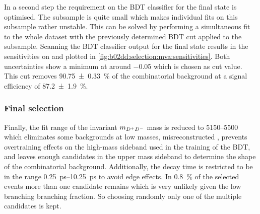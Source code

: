 In a second step the requirement on the BDT classifier for the \KKpiKpipi
final state is optimised. The \KKpiKpipi subsample is quite small which makes
individual fits on this subsample rather unstable. This can be solved by
performing a simultaneous fit to the whole dataset with the previously
determined BDT cut applied to the \KpipiKpipi subsample. Scanning the BDT
classifier output for the \KKpiKpipi final state results in the sensitivities
on \SDD and \CDD plotted in \cref{fig:b02dd:selection:mva:sensitivities}. Both
uncertainties show a minimum at around \num{-0.05} which is chosen as cut
value. This cut removes \SI{90.75\pm0.33}{\percent} of the combinatorial
background at a signal efficiency of \SI{87.2\pm1.9}{\percent}.

\subsubsection{Final selection}
\label{sec:b02dd:selection:final_selection}

Finally, the fit range of the invariant $m_{{{D}^+}{{D}^-}}$ mass is reduced to
\SIrange{5150}{5500}{\MeVcc} which eliminates some backgrounds at low masses,
\eg misreconstructed \BdToDstD, prevents overtraining effects on the high-mass
sideband used in the training of the BDT, and leaves enough candidates in the
upper mass sideband to determine the shape of the combinatorial background.
Additionally, the decay time is restricted to be in the range
\SIrange{0.25}{10.25}{\ps} to avoid edge effects. In \SI{0.8}{\percent} of the
selected events more than one candidate remains which is very unlikely given
the low branching branching fraction. So choosing randomly only one of the
multiple candidates is kept.

\clearpage
